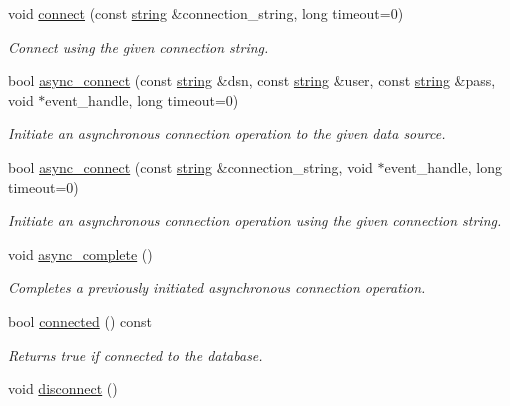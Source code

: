 \begin{DoxyCompactItemize}
void \mbox{\hyperlink{classnanodbc_1_1connection_ac40809d558a6a56b70e9fcbc16a12ceb}{connect}} (const \mbox{\hyperlink{namespacenanodbc_abfc0ece56278e590911ec8352774c212}{string}} \&connection\+\_\+string, long timeout=0)
\begin{DoxyCompactList}\small\item\em Connect using the given connection string. \end{DoxyCompactList}\item 
bool \mbox{\hyperlink{classnanodbc_1_1connection_a14b8cee67a5dd9a9310e8ffc7b45e62b}{async\+\_\+connect}} (const \mbox{\hyperlink{namespacenanodbc_abfc0ece56278e590911ec8352774c212}{string}} \&dsn, const \mbox{\hyperlink{namespacenanodbc_abfc0ece56278e590911ec8352774c212}{string}} \&user, const \mbox{\hyperlink{namespacenanodbc_abfc0ece56278e590911ec8352774c212}{string}} \&pass, void $\ast$event\+\_\+handle, long timeout=0)
\begin{DoxyCompactList}\small\item\em Initiate an asynchronous connection operation to the given data source. \end{DoxyCompactList}\item 
bool \mbox{\hyperlink{classnanodbc_1_1connection_ab8c6fddf14ec8e6ff136ec0e9dc0aa79}{async\+\_\+connect}} (const \mbox{\hyperlink{namespacenanodbc_abfc0ece56278e590911ec8352774c212}{string}} \&connection\+\_\+string, void $\ast$event\+\_\+handle, long timeout=0)
\begin{DoxyCompactList}\small\item\em Initiate an asynchronous connection operation using the given connection string. \end{DoxyCompactList}\item 
void \mbox{\hyperlink{classnanodbc_1_1connection_a553744244891734178611487703063d3}{async\+\_\+complete}} ()
\begin{DoxyCompactList}\small\item\em Completes a previously initiated asynchronous connection operation. \end{DoxyCompactList}\item 
bool \mbox{\hyperlink{classnanodbc_1_1connection_a703da57a7ce3c572f472132ba49a1114}{connected}} () const
\begin{DoxyCompactList}\small\item\em Returns true if connected to the database. \end{DoxyCompactList}\item 
void \mbox{\hyperlink{classnanodbc_1_1connection_adf614b7fdc08596122ca12e21a61ba34}{disconnect}} ()

\end{DoxyCompactItemize}
